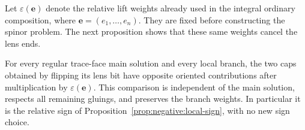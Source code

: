 Let $\varepsilon(\mathbf e)$ denote the relative lift weights already
used in the integral ordinary composition, where
$\mathbf e=(e_1,\ldots,e_n)$.  They are fixed before constructing
the spinor problem.  The next proposition shows that these same
weights cancel the lens ends.

\begin{proposition}
\label{prop:gluing:signs}
For every regular trace-face main solution and every local branch,
the two caps obtained by flipping its lens bit have opposite
oriented contributions after multiplication by
$\varepsilon(\mathbf e)$.  This comparison is independent of the
main solution, respects all remaining gluings, and preserves the
branch weights.  In particular it is the relative sign of
Proposition~\ref{prop:negative:local-sign}, with no new sign choice.
\end{proposition}

